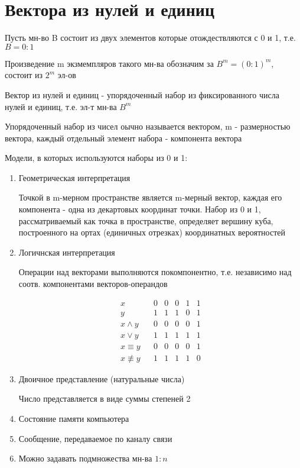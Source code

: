 \documentclass[discrete.tex]{subfiles}
\begin{document}
  \section{Вектора из нулей и единиц}
  
  Пусть мн-во B состоит из двух элементов которые отождествляются с 0 и 1, т.е. $B = 0:1$

  Произведение m экзмемпляров такого мн-ва обозначим за $B^m=(0:1)^m$, состоит из $2^m$ эл-ов
  \begin{definition}
    Вектор из нулей и единиц - упорядоченный набор из фиксированного числа нулей и единиц, т.е. эл-т мн-ва $B^m$
  \end{definition}
  Упорядоченный набор из чисел оычно называется вектором, m - размерностью вектора, каждый отдельный элемент набора - компонента вектора
  \begin{remark}
    Модели, в которых используются наборы из 0 и 1:
    \begin{enumerate}
      \item Геометрическая интерпретация

      Точкой в m-мерном пространстве является m-мерный вектор, каждая его компонента - одна из декартовых координат точки. Набор из 0 и 1, рассматриваемый как точка в пространстве, определяет вершину куба, построенного на ортах (единичных отрезках) координатных вероятностей
      \item Логичнская интерпретация

      Операции над векторами выполняются покомпонентно, т.е. независимо над соотв. компонентами векторов-операндов
      \begin{Example}
        \[\begin{matrix}
          x && 0 & 0 & 0 & 1 & 1\\
          y && 1 & 1 & 1 & 0 & 1\\
          x \wedge y && 0 & 0 & 0 & 0 & 1\\
          x \vee y && 1 & 1 & 1 & 1 & 1\\
          x \equiv y && 0 & 0 & 0 & 0 & 1\\
          x \not \equiv y && 1 & 1 & 1 & 1 & 0
        \end{matrix}\]
      \end{Example}
      \item Двоичное представление (натуральные числа)

      Число представляется в виде суммы степеней 2
      \item Состояние памяти компьютера
      \item Сообщение, передаваемое по каналу связи
      \item Можно задавать подмножества мн-ва $1:n$
    \end{enumerate}
  \end{remark}
\end{document}
